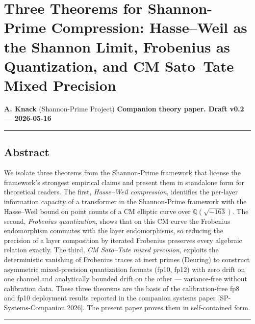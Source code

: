 \documentclass[
  11pt,
]{article}
\author{}
\date{}
\begin{document}
\hypertarget{three-theorems-for-shannon-prime-compression-hasseweil-as-the-shannon-limit-frobenius-as-quantization-and-cm-satotate-mixed-precision}{%
\section{Three Theorems for Shannon-Prime Compression: Hasse--Weil as
the Shannon Limit, Frobenius as Quantization, and CM Sato--Tate Mixed
Precision}\label{three-theorems-for-shannon-prime-compression-hasseweil-as-the-shannon-limit-frobenius-as-quantization-and-cm-satotate-mixed-precision}}

\textbf{A. Knack} (Shannon-Prime Project) \textbf{Companion theory
paper. Draft v0.2 --- 2026-05-16}

\begin{center}\rule{0.5\linewidth}{0.5pt}\end{center}

\hypertarget{abstract}{%
\subsection{Abstract}\label{abstract}}

We isolate three theorems from the Shannon-Prime framework that license
the framework's strongest empirical claims and present them in
standalone form for theoretical readers. The first, \emph{Hasse--Weil
compression}, identifies the per-layer information capacity of a
transformer in the Shannon-Prime framework with the Hasse--Weil bound on
point counts of a CM elliptic curve over \(\mathbb{Q}(\sqrt{-163})\).
The second, \emph{Frobenius quantization}, shows that on this CM curve
the Frobenius endomorphism commutes with the layer endomorphisms, so
reducing the precision of a layer composition by iterated Frobenius
preserves every algebraic relation exactly. The third, \emph{CM
Sato--Tate mixed precision}, exploits the deterministic vanishing of
Frobenius traces at inert primes (Deuring) to construct asymmetric
mixed-precision quantization formats (fp10, fp12) with zero drift on one
channel and analytically bounded drift on the other --- variance-free
without calibration data. These three theorems are the basis of the
calibration-free fp8 and fp10 deployment results reported in the
companion systems paper {[}SP-Systems-Companion 2026{]}. The present
paper proves them in self-contained form.

\begin{center}\rule{0.5\linewidth}{0.5pt}\end{center}
\end{document}
